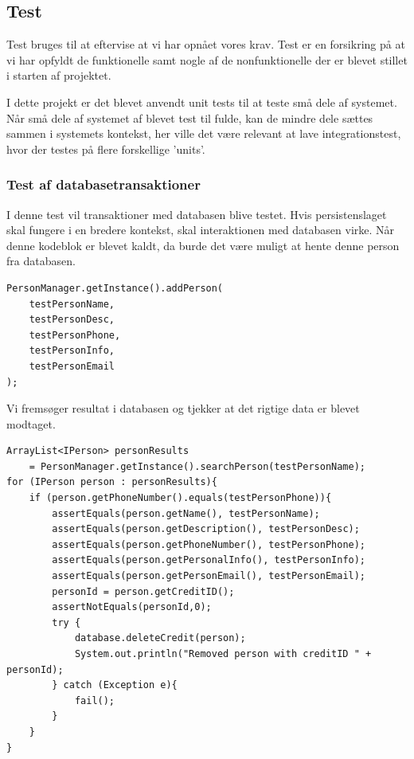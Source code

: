 \newpage
\subsection{Test}

Test bruges til at eftervise at vi har opnået vores krav. Test er en forsikring
på at vi har opfyldt de funktionelle samt nogle af de nonfunktionelle der er
blevet stillet i starten af projektet.

I dette projekt er det blevet anvendt unit tests til at teste små dele af
systemet. Når små dele af systemet af blevet test til fulde, kan de mindre dele
sættes sammen i systemets kontekst, her ville det være relevant at lave
integrationstest, hvor der testes på flere forskellige 'units'.

\subsubsection{Test af databasetransaktioner}%
\label{ssub:test_af_database_transaktioner}

I denne test vil transaktioner med databasen blive testet. Hvis
persistenslaget skal fungere i en bredere kontekst, skal interaktionen med
databasen virke. Når denne kodeblok er blevet kaldt, da burde det være muligt at
hente denne person fra databasen.

\begin{lstlisting}
PersonManager.getInstance().addPerson(
    testPersonName,
    testPersonDesc,
    testPersonPhone,
    testPersonInfo,
    testPersonEmail
);
\end{lstlisting}

Vi fremsøger resultat i databasen og tjekker at det rigtige data er blevet
modtaget.

\begin{lstlisting}
ArrayList<IPerson> personResults 
    = PersonManager.getInstance().searchPerson(testPersonName);
for (IPerson person : personResults){
    if (person.getPhoneNumber().equals(testPersonPhone)){
        assertEquals(person.getName(), testPersonName);
        assertEquals(person.getDescription(), testPersonDesc);
        assertEquals(person.getPhoneNumber(), testPersonPhone);
        assertEquals(person.getPersonalInfo(), testPersonInfo);
        assertEquals(person.getPersonEmail(), testPersonEmail);
        personId = person.getCreditID();
        assertNotEquals(personId,0);
        try {
            database.deleteCredit(person);
            System.out.println("Removed person with creditID " + personId);
        } catch (Exception e){
            fail();
        }
    }
}
\end{lstlisting}

